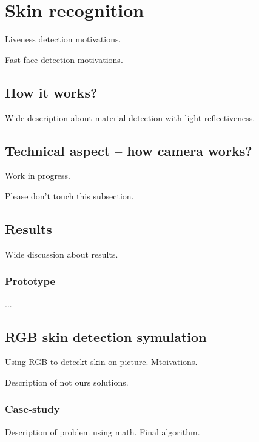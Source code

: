 \section{Skin recognition}
    Liveness detection motivations.

    Fast face detection motivations.

    \subsection{How it works?}
        Wide description about material detection
        with light reflectiveness.

    \subsection{Technical aspect -- how camera works?}
        Work in progress.

        Please don't touch this subsection.

    \subsection{Results}
        Wide discussion about results.

        \subsubsection*{Prototype}
            ...

    \subsection{RGB skin detection symulation}
        Using RGB to deteckt skin on picture.
        Mtoivations.

        Description of not ours solutions.

        \subsubsection*{Case-study}
            Description of problem using math.
            Final algorithm.

